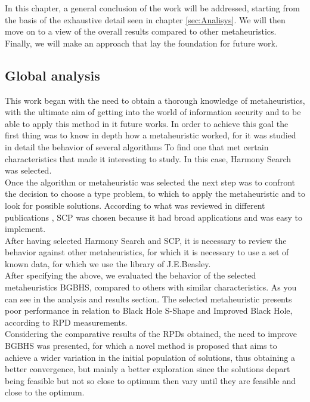 In this chapter, a general conclusion of the work will be addressed, starting from the basis of the exhaustive detail seen in chapter \ref{sec:Analisys}.
We will then move on to a view of the overall results compared to other metaheuristics. Finally, we will make an approach that lay the foundation for future work.

\subsection{Global analysis}
This work began with the need to obtain a thorough knowledge of metaheuristics, with the ultimate aim of getting into the world of information security and to be able to apply this method in it future works. In order to achieve this goal the first thing was to know in depth how a metaheuristic worked, for it was studied in detail the behavior of several algorithms
To find one that met certain characteristics that made it interesting to study. In this case, Harmony Search was selected.\\

Once the algorithm or metaheuristic was selected the next step was to confront the decision to choose a type problem, to which to apply the metaheuristic and to look for possible solutions. According to what was reviewed in different publications \cite{DBLP:journals/eswa/Lanza-Gutierrez17, DBLP:conf/csoc/CrawfordSAO16,DBLP:conf/csoc/CrawfordSBO16}, SCP was chosen because it had broad applications and was easy to implement.\\

After having selected Harmony Search and SCP, it is necessary to review the behavior against other metaheuristics, for which it is necessary to use a set of known data, for which we use the library of J.E.Beasley.\\

After specifying the above, we evaluated the behavior of the selected metaheuristics BGBHS, compared to others with similar characteristics. As you can see in the analysis and results section. The selected metaheuristic presents poor performance in relation to Black Hole S-Shape and Improved Black Hole, according to RPD measurements.\\

Considering the comparative results of the RPDs obtained, the need to improve BGBHS was presented, for which a novel method is proposed that aims to achieve a wider variation in the initial population of solutions, thus obtaining a better convergence, but mainly a better exploration since the solutions depart being feasible but not so close to optimum then vary until they are feasible and close to the optimum.\\

